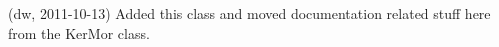 
\begin{DoxyRefList}
\item[\label{newfeat1_2__newfeat1_2000001}%
\hypertarget{newfeat1_2__newfeat1_2000001}{}%
Class \hyperlink{class_matlab_doc_maker}{Matlab\+Doc\+Maker} ](dw, 2011-\/10-\/13) Added this class and moved documentation related stuff here from the Ker\+Mor class.
\end{DoxyRefList}